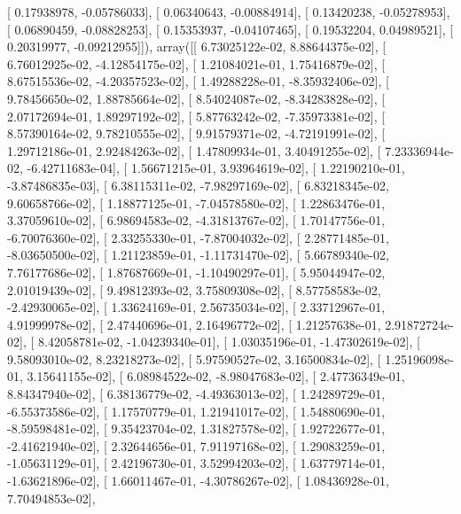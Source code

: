 \documentclass{article}
\begin{document}
       [ 0.17938978, -0.05786033],
       [ 0.06340643, -0.00884914],
       [ 0.13420238, -0.05278953],
       [ 0.06890459, -0.08828253],
       [ 0.15353937, -0.04107465],
       [ 0.19532204,  0.04989521],
       [ 0.20319977, -0.09212955]]), array([[  6.73025122e-02,   8.88644375e-02],
       [  6.76012925e-02,  -4.12854175e-02],
       [  1.21084021e-01,   1.75416879e-02],
       [  8.67515536e-02,  -4.20357523e-02],
       [  1.49288228e-01,  -8.35932406e-02],
       [  9.78456650e-02,   1.88785664e-02],
       [  8.54024087e-02,  -8.34283828e-02],
       [  2.07172694e-01,   1.89297192e-02],
       [  5.87763242e-02,  -7.35973381e-02],
       [  8.57390164e-02,   9.78210555e-02],
       [  9.91579371e-02,  -4.72191991e-02],
       [  1.29712186e-01,   2.92484263e-02],
       [  1.47809934e-01,   3.40491255e-02],
       [  7.23336944e-02,  -6.42711683e-04],
       [  1.56671215e-01,   3.93964619e-02],
       [  1.22190210e-01,  -3.87486835e-03],
       [  6.38115311e-02,  -7.98297169e-02],
       [  6.83218345e-02,   9.60658766e-02],
       [  1.18877125e-01,  -7.04578580e-02],
       [  1.22863476e-01,   3.37059610e-02],
       [  6.98694583e-02,  -4.31813767e-02],
       [  1.70147756e-01,  -6.70076360e-02],
       [  2.33255330e-01,  -7.87004032e-02],
       [  2.28771485e-01,  -8.03650500e-02],
       [  1.21123859e-01,  -1.11731470e-02],
       [  5.66789340e-02,   7.76177686e-02],
       [  1.87687669e-01,  -1.10490297e-01],
       [  5.95044947e-02,   2.01019439e-02],
       [  9.49812393e-02,   3.75809308e-02],
       [  8.57758583e-02,  -2.42930065e-02],
       [  1.33624169e-01,   2.56735034e-02],
       [  2.33712967e-01,   4.91999978e-02],
       [  2.47440696e-01,   2.16496772e-02],
       [  1.21257638e-01,   2.91872724e-02],
       [  8.42058781e-02,  -1.04239340e-01],
       [  1.03035196e-01,  -1.47302619e-02],
       [  9.58093010e-02,   8.23218273e-02],
       [  5.97590527e-02,   3.16500834e-02],
       [  1.25196098e-01,   3.15641155e-02],
       [  6.08984522e-02,  -8.98047683e-02],
       [  2.47736349e-01,   8.84347940e-02],
       [  6.38136779e-02,  -4.49363013e-02],
       [  1.24289729e-01,  -6.55373586e-02],
       [  1.17570779e-01,   1.21941017e-02],
       [  1.54880690e-01,  -8.59598481e-02],
       [  9.35423704e-02,   1.31827578e-02],
       [  1.92722677e-01,  -2.41621940e-02],
       [  2.32644656e-01,   7.91197168e-02],
       [  1.29083259e-01,  -1.05631129e-01],
       [  2.42196730e-01,   3.52994203e-02],
       [  1.63779714e-01,  -1.63621896e-02],
       [  1.66011467e-01,  -4.30786267e-02],
       [  1.08436928e-01,   7.70494853e-02],
\end{document}
